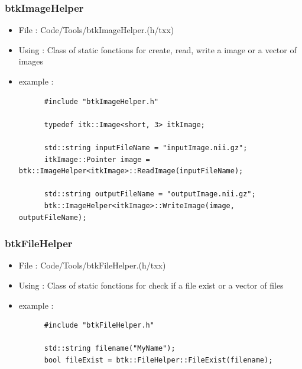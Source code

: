     \subsubsection{btkImageHelper}
    \begin{itemize}
    \item File : Code/Tools/btkImageHelper.(h/txx)
    \item Using : Class of static fonctions for create, read, write a image or a vector of images
    \item example :
      \begin{verbatim}
      #include "btkImageHelper.h"
                 
      typedef itk::Image<short, 3> itkImage;
      
      std::string inputFileName = "inputImage.nii.gz";      
      itkImage::Pointer image = btk::ImageHelper<itkImage>::ReadImage(inputFileName);
      
      std::string outputFileName = "outputImage.nii.gz";
      btk::ImageHelper<itkImage>::WriteImage(image, outputFileName);

      \end{verbatim}
    \end{itemize}

    \subsubsection{btkFileHelper}
    \begin{itemize}
    \item File : Code/Tools/btkFileHelper.(h/txx)
    \item Using : Class of static fonctions for check if a file exist or a vector of files
    \item example :
      \begin{verbatim}
      #include "btkFileHelper.h"

      std::string filename("MyName");
      bool fileExist = btk::FileHelper::FileExist(filename);
      \end{verbatim}

    \end{itemize}

